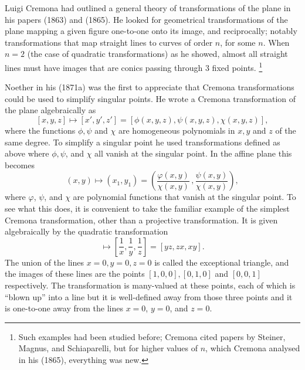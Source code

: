 Luigi Cremona
%
had  outlined a general theory of transformations of
the plane in his papers (1863) and (1865). He looked for geometrical
transformations of the plane mapping a given figure one-to-one onto its
image, and reciprocally; notably  transformations that map straight lines
to curves of order $n$, for some $n$. When $n=2$ (the case of quadratic
transformations)  as he showed, almost all straight lines must have
images that are conics passing through 3 fixed points.%
%
\footnote{Such
examples had been studied before; Cremona  cited papers by Steiner,
%
%
Magnus, and Schiaparelli,
%
 but for higher values of $n$, which Cremona
analysed in his (1865), everything was new.}



Noether in his (1871a) was the first to appreciate that Cremona
transformations could be used to simplify singular points.  He wrote a
Cremona transformation of the plane algebraically as
$$
[x,y,z] \mapsto [x',y',z'] = [\phi (x,y,z), \psi (x, y, z),  \chi (x,
y, z)],
$$
where the functions $\phi, \psi$ and $\chi$ are homogeneous polynomials
in $x, y$ and $z$ of the same degree. To simplify a singular point he used
transformations defined as above where $\phi, \psi$, and $\chi$ all
vanish at the singular point.  In the affine plane this becomes
$$(x , y) \mapsto (x_1 , y_1) = \left(\frac{\varphi (x, y)}{\chi (x,
y)}\,,  \frac{\psi (x, y)}{\chi (x, y)} \right),$$
where $\varphi$, $\psi$, and $\chi$ are polynomial functions that vanish
at the singular point.  To see what this does, it is convenient to take
the familiar example of
the simplest  Cremona transformation,
%
 other than a projective
transformation. It  is given algebraically by  the quadratic
transformation
\begin{equation*}
[x, y, z] \mapsto \left[\frac{1}{x}, \frac{1}{y}, \frac{1}{z}\right] =
[yz, zx, xy]
.
\end{equation*}
The union of the lines $x=0,y=0,z=0$ is called the exceptional triangle,
and the images of these lines are the points $[1, 0, 0], [0, 1, 0]$
and $[0, 0, 1]$ respectively.
The transformation is many-valued at these points, each of which is
%
``blown up'' into a line  but it is well-defined away from those three
points and it is  one-to-one away from  the lines $x=0$, $y=0$, and $z
= 0$.


